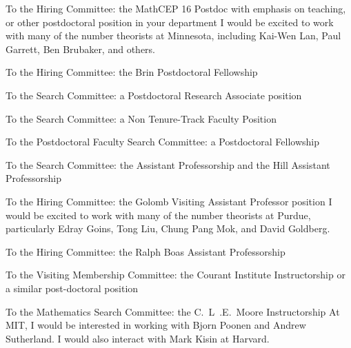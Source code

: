 \documentclass[11pt]{letter}
\begin{document}
\coverletter
  {\uminn}
  {To the Hiring Committee:}
  {the MathCEP 16 Postdoc with emphasis on teaching, or other postdoctoral position in your department}
  {\mathjobs}
  {I would be excited to work with many of the number theorists at Minnesota, including Kai-Wen Lan, Paul Garrett, Ben Brubaker, and others.}
  {}
  {\generic}

\coverletter
  {\umaryland}
  {To the Hiring Committee:}
  {the Brin Postdoctoral Fellowship}
  {\mathjobs}
  {}
  {}
  {\generic}

\coverletter
  {\uarizona}
  {To the Search Committee:}
  {a Postdoctoral Research Associate position}
  {\mathjobs}
  {}
  {}
  {\generic}
  
\coverletter
  {\psu}
  {To the Search Committee:}
  {a Non Tenure-Track Faculty Position}
  {\mathjobs}
  {}
  {}
  {\generic}

\coverletter
  {\cunygrad}
  {To the Postdoctoral Faculty Search Committee:}
  {a Postdoctoral Fellowship}
  {\mathjobs}
  {}
  {}
  {\noteachingnopub}

\coverletter
  {\rutgers}
  {To the Search Committee:}
  {the Assistant Professorship and the Hill Assistant Professorship}
  {\mathjobs}
  {}
  {}
  {\nopublications}

\coverletter
	{\purdue}
	{To the Hiring Committee:}
	{the Golomb Visiting Assistant Professor position}
	{\mathjobs}
	{I would be excited to work with many of the number theorists at Purdue, particularly Edray Goins, Tong Liu, Chung Pang Mok, and David Goldberg.}
	{}
	{\nopublications}


\coverletter
  {\northwestern}
  {To the Hiring Committee:}
  {the Ralph Boas Assistant Professorship}
  {\mathjobs}
  {}
  {}
  {\nopublications}

\coverletter
  {\nyu}
  {To the Visiting Membership Committee:}
  {the Courant Institute Instructorship or a similar post-doctoral position}
  {\mathjobs}
  {}
  {}
  {\generic}

\coverletter
  {\mit}
  {To the Mathematics Search Committee:}
  {the C.~L~.E.~Moore Instructorship}
  {\mathjobs}
  {At MIT, I would be interested in working with Bjorn Poonen and Andrew Sutherland.  I would also interact with Mark Kisin at Harvard.}
  {}
  {\generic}
\end{document}
